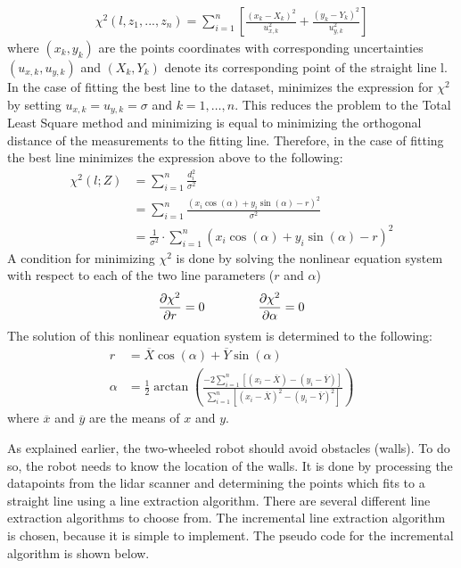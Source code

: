\documentclass[../Head/Main.tex]{subfiles}
\begin{document}
\begin{align}
    \chi^2\left(l, z_1, ..., z_n\right) = \sum_{i = 1}^{n} \left[\frac{\left(x_k - X_k\right)^2}{u_{x, k}^{2}} + \frac{\left(y_k - Y_k\right)^2}{u_{y, k}^{2}}\right]
\end{align}
where $(x_k,y_k)$ are the points coordinates with corresponding uncertainties $(u_{x, k},u_{y, k})$ and $(X_k,Y_k)$ denote its corresponding point of the straight line l. In the case of fitting the best line to the dataset, minimizes the expression for $\chi^2$ by setting $u_{x, k}=u_{y, k}=\sigma$ and $k=1,…,n$. This reduces the problem to the Total Least Square method and minimizing is equal to minimizing the orthogonal distance of the measurements to the fitting line. Therefore, in the case  of fitting the best line minimizes the expression above to the following:
\begin{align}
    \chi^2\left(l; Z\right) &= \sum_{i = 1}^{n} \frac{d_i^2}{\sigma^2} \\
    &= \sum_{i = 1}^{n}\frac{\left(x_i\cos(\alpha) + y_i\sin⁡(\alpha)-r\right)^2}{\sigma^2}\\
    &= \frac{1}{\sigma^2}\cdot\sum_{i = 1}^{n}\left(x_i\cos(\alpha) + y_i\sin⁡(\alpha)-r\right)^2
\end{align}
A condition for minimizing $\chi^2$ is done by solving the nonlinear equation system with respect to each of the two line parameters ($r$ and $\alpha$)
\begin{align}
    \frac{\partial\chi^2}{\partial r} = 0 \hspace{1.5cm} \frac{\partial\chi^2}{\partial\alpha} = 0
\end{align}
The solution of this nonlinear equation system is determined to the following:
\begin{align}
	r &= \overline{X}\cos(\alpha)+\overline{Y}\sin(\alpha) \\
    \alpha &= \frac{1}{2}\arctan\left(\frac{-2\sum_{i=1}^{n}\left[\left(x_i-\overline{X}\right) - \left(y_i-\overline{Y}\right)\right]}{\sum_{i = 1}^{n}\left[\left(x_i-\overline{X}\right)^2 - \left(y_i-\overline{Y}\right)^2\right]}\right)
\end{align}
where $\overline{x}$ and $\overline{y}$ are the means of $x$ and $y$. \par
As explained earlier, the two-wheeled robot should avoid obstacles (walls). To do so, the robot needs to know the location of the walls. It is done by processing the datapoints from the lidar scanner and determining the points which fits to a straight line using a line extraction algorithm. There are several different line extraction algorithms to choose from. The incremental line extraction algorithm is chosen, because it is simple to implement. The pseudo code for the incremental algorithm is shown below. \par
\end{document}
